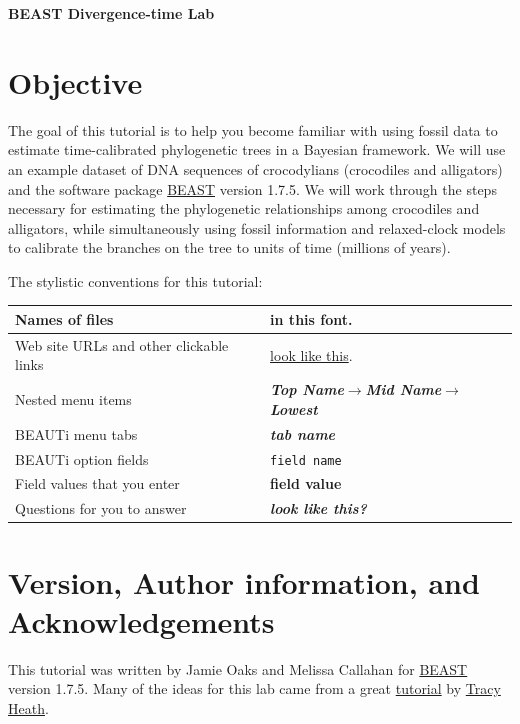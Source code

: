 \documentclass{article}
\newcommand{\localfile}[1]{\textsf{#1}\xspace}
\newcommand{\menutab}[1]{\textbf{\textit{#1}}\xspace}
\newcommand{\subsubItem}[3]{\menutab{#1}$\rightarrow$\menutab{#2}$\rightarrow$\menutab{#3}\xspace}
\newcommand{\program}[1]{#1\xspace}
\newcommand{\beast}{\href{http://beast.bio.ed.ac.uk/Main_Page}{\program{BEAST}}\xspace}
\newcommand{\field}[1]{\texttt{#1}\xspace}
\newcommand{\fieldvalue}[1]{{\bfseries\sffamily #1}\xspace}
\newcommand{\questionfont}[1]{{\bfseries\sffamily\textit{#1}}\xspace}
\begin{document}
{\Large\bf BEAST Divergence-time Lab}
{\singlespacing \tableofcontents}
\newpage

\section{Objective}
The goal of this tutorial is to help you become familiar with using fossil data
to estimate time-calibrated phylogenetic trees in a Bayesian framework.
We will use an example dataset of DNA sequences of crocodylians (crocodiles and alligators)
and the software package \beast version 1.7.5.
We will work through the steps necessary for estimating the phylogenetic
relationships among crocodiles and alligators, while simultaneously using
fossil information and relaxed-clock models to calibrate the branches on the
tree to units of time (millions of years).

The stylistic conventions for this tutorial:

\begin{tabular}{|p{3.2in}|p{2.8in}|}
\hline	Names of files & \localfile{in this font}.\\
\hline	Web site URLs and other clickable links &  \href{http://www.google.com}{look like this}.\\
\hline	Nested menu items & \subsubItem{Top Name}{Mid Name}{Lowest}\\
\hline	\program{BEAUTi} menu tabs & \menutab{tab name}\\
\hline	\program{BEAUTi} option fields & \field{field name}\\
\hline	Field values that you enter & \fieldvalue{field value}\\
\hline	Questions for you to answer & \questionfont{look like this?}\\
\hline
\end{tabular}

\section{Version, Author information, and Acknowledgements}
This tutorial was written by Jamie Oaks and Melissa Callahan for \beast version
1.7.5.
Many of the ideas for this lab came from a great
\href{http://treethinkers.org/divergence-time-estimation-using-beast/}{tutorial}
by \href{http://phylo.bio.ku.edu/content/tracy-heath}{Tracy Heath}.
\end{document}
